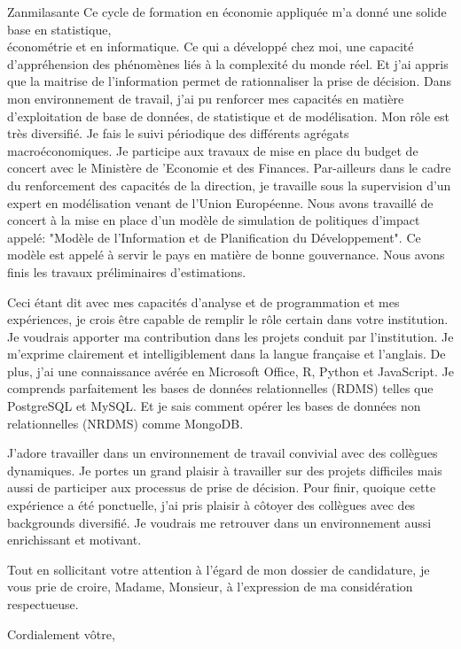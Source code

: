 \documentclass[11pt]{letter} %
\begin{document}
\begin{letter}{Zanmilasante}
	Ce cycle de formation en économie appliquée m’a donné une solide base en statistique, \\
	économétrie et en informatique. Ce qui a développé chez moi, une capacité d’appréhension des phénomènes liés à la complexité du monde réel. Et j’ai appris que la maitrise de l’information permet de rationnaliser la prise de décision. Dans mon environnement de travail, j’ai pu renforcer mes capacités en matière d’exploitation de base de données, de statistique et de modélisation. Mon rôle est très diversifié. Je fais le suivi périodique des différents agrégats macroéconomiques. Je participe aux travaux de mise en place du budget de concert avec le Ministère de ’Economie et des Finances. Par-ailleurs dans le cadre du renforcement des capacités de la direction, je travaille sous la supervision d’un expert en modélisation venant de l’Union Européenne. Nous avons travaillé de concert à la mise en place d’un modèle de simulation de politiques d’impact appelé: "Modèle de l’Information et de Planification du Développement". Ce modèle est appelé à servir le pays en matière de bonne gouvernance. Nous avons finis les travaux préliminaires d’estimations.
	
	Ceci étant dit avec mes capacités d’analyse et de programmation et mes expériences, je crois être capable de remplir le rôle certain dans votre institution. Je voudrais apporter ma contribution dans les projets  conduit par l’institution. Je m’exprime clairement et intelligiblement dans la langue française et l’anglais. De plus, j’ai une connaissance avérée en Microsoft Office, R, Python et JavaScript. Je comprends parfaitement les bases de données relationnelles (RDMS) telles que PostgreSQL et MySQL. Et je sais comment opérer les bases de données non relationnelles (NRDMS) comme MongoDB.
	
	J’adore travailler dans un environnement de travail convivial avec des collègues dynamiques. Je portes un grand plaisir à travailler sur des projets difficiles mais aussi de participer aux processus de prise de décision. Pour finir, quoique cette expérience a été ponctuelle, j’ai pris plaisir à côtoyer des collègues  avec des backgrounds diversifié. Je voudrais me retrouver dans un environnement aussi enrichissant et motivant.
	
	
	Tout en sollicitant votre attention à l’égard de mon dossier de candidature, je vous prie de croire, Madame, Monsieur, à l’expression de ma considération respectueuse.

 


\closing{Cordialement v\^{o}tre,}




\end{letter}
\end{document}
